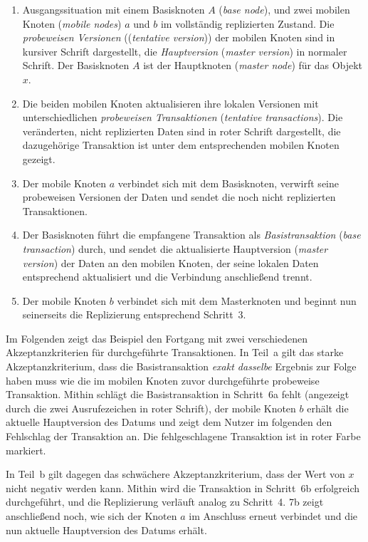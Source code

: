 \documentclass[11pt,a4paper]{scrartcl}
\begin{document}
\begin{enumerate}
\item Ausgangssituation mit einem Basisknoten $A$ (\emph{base node}), und zwei
  mobilen Knoten (\emph{mobile nodes}) $a$ und $b$ im vollständig replizierten
  Zustand.  Die \emph{probeweisen Versionen} ((\emph{tentative version})) der
  mobilen Knoten sind in kursiver Schrift dargestellt, die \emph{Hauptversion}
  (\emph{master version}) in normaler Schrift.  Der Basisknoten $A$ ist der
  Hauptknoten (\emph{master node}) für das Objekt $x$.
\item Die beiden mobilen Knoten aktualisieren ihre lokalen Versionen mit
  unterschiedlichen \emph{probeweisen Transaktionen} (\emph{tentative
    transactions}).  Die veränderten, nicht replizierten Daten sind in roter
  Schrift dargestellt, die dazugehörige Transaktion ist unter dem
  entsprechenden mobilen Knoten gezeigt.
\item Der mobile Knoten $a$ verbindet sich mit dem Basisknoten, verwirft seine
  probeweisen Versionen der Daten und sendet die noch nicht replizierten
  Transaktionen.
\item Der Basisknoten führt die empfangene Transaktion als
  \emph{Basistransaktion} (\emph{base transaction}) durch, und sendet die
  aktualisierte Hauptversion (\emph{master version}) der Daten an den mobilen
  Knoten, der seine lokalen Daten entsprechend aktualisiert und die Verbindung
  anschließend trennt.
\item Der mobile Knoten $b$ verbindet sich mit dem Masterknoten und beginnt nun
  seinerseits die Replizierung entsprechend Schritt~3.
\end{enumerate}

Im Folgenden zeigt das Beispiel den Fortgang mit zwei verschiedenen
Akzeptanzkriterien für durchgeführte Transaktionen.  In Teil~a gilt das starke
Akzeptanzkriterium, dass die Basistransaktion \emph{exakt dasselbe} Ergebnis
zur Folge haben muss wie die im mobilen Knoten zuvor durchgeführte probeweise
Transaktion.  Mithin schlägt die Basistransaktion in Schritt~6a fehlt
(angezeigt durch die zwei Ausrufezeichen in roter Schrift), der mobile Knoten
$b$ erhält die aktuelle Hauptversion des Datums und zeigt dem Nutzer im
folgenden den Fehlschlag der Transaktion an.  Die fehlgeschlagene Transaktion
ist in roter Farbe markiert.

In Teil~b gilt dagegen das schwächere Akzeptanzkriterium, dass der Wert von $x$
nicht negativ werden kann.  Mithin wird die Transaktion in Schritt~6b
erfolgreich durchgeführt, und die Replizierung verläuft analog zu Schritt~4.
7b zeigt anschließend noch, wie sich der Knoten $a$ im Anschluss erneut
verbindet und die nun aktuelle Hauptversion des Datums erhält.
\end{document}
